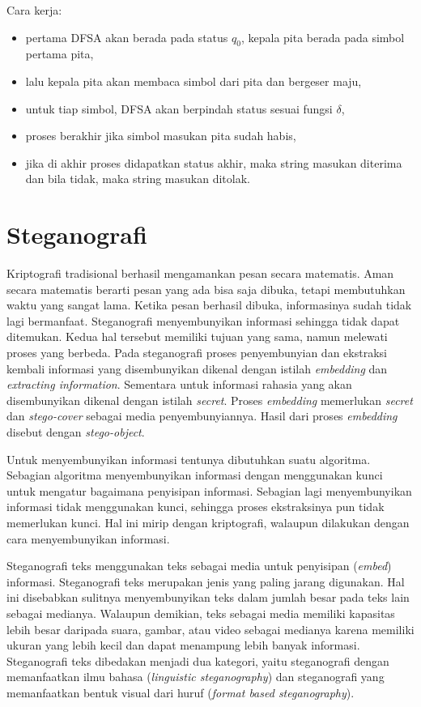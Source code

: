 Cara kerja:

\begin{itemize}
	\item pertama DFSA akan berada pada status $q_0$, kepala pita berada pada simbol pertama pita,
	\item lalu kepala pita akan membaca simbol dari pita dan bergeser maju,
	\item untuk tiap simbol, DFSA akan berpindah status sesuai fungsi $\delta$,
	\item proses berakhir jika simbol masukan pita sudah habis,
	\item jika di akhir proses didapatkan status akhir, maka string masukan diterima dan bila tidak, maka string masukan ditolak.
\end{itemize}

\section{Steganografi}
\label{sec:steganografi}

Kriptografi tradisional berhasil mengamankan pesan secara matematis\cite{Dpcrypto:2009}. Aman secara matematis berarti pesan yang ada bisa saja dibuka, tetapi membutuhkan waktu yang sangat lama. Ketika pesan berhasil dibuka, informasinya sudah tidak lagi bermanfaat. Steganografi menyembunyikan informasi sehingga tidak dapat ditemukan. Kedua hal tersebut memiliki tujuan yang sama, namun melewati proses yang berbeda. Pada steganografi proses penyembunyian dan ekstraksi kembali informasi yang disembunyikan dikenal dengan istilah \textit{embedding} dan \textit{extracting information}.  Sementara untuk informasi rahasia yang akan disembunyikan dikenal dengan istilah \textit{secret}. Proses \textit{embedding} memerlukan \textit{secret} dan \textit{stego-cover} sebagai media penyembunyiannya. Hasil dari proses \textit{embedding} disebut dengan \textit{stego-object}.

Untuk menyembunyikan informasi tentunya dibutuhkan suatu algoritma. Sebagian algoritma menyembunyikan informasi dengan menggunakan kunci untuk mengatur bagaimana penyisipan informasi. Sebagian lagi menyembunyikan informasi tidak menggunakan kunci, sehingga proses ekstraksinya pun tidak memerlukan kunci. Hal ini mirip dengan kriptografi, walaupun dilakukan dengan cara menyembunyikan informasi.

Steganografi teks menggunakan teks sebagai media untuk penyisipan (\textit{embed}) informasi.  Steganografi teks merupakan jenis yang paling jarang digunakan. Hal ini disebabkan sulitnya menyembunyikan teks dalam jumlah besar pada teks lain sebagai medianya. Walaupun demikian, teks sebagai media memiliki kapasitas lebih besar daripada suara, gambar, atau video sebagai medianya karena memiliki ukuran yang lebih kecil dan dapat menampung lebih banyak informasi. Steganografi teks dibedakan menjadi dua kategori, yaitu steganografi dengan memanfaatkan ilmu bahasa (\textit{linguistic steganography}) dan steganografi yang memanfaatkan bentuk visual dari huruf (\textit{format based steganography}).

